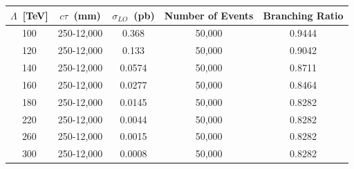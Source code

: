\begin{minipage}{0.90\linewidth} 
\begin{center}
\centering
\begin{tabular}{c c c c c}
       \toprule
        \hline
        $\Lambda$~[TeV] & $c\tau$~(mm) & $\sigma_{LO}$~(pb) & \bfseries{Number of Events} & \bfseries{Branching Ratio}\\
       \hline
       \toprule
       100 & 250-12,000  & 0.368  & 50,000 & 0.9444\\
       120 & 250-12,000  & 0.133  & 50,000 & 0.9042\\
       140 & 250-12,000  & 0.0574 & 50,000 & 0.8711\\
       160 & 250-12,000  & 0.0277 & 50,000 & 0.8464\\
       180 & 250-12,000  & 0.0145 & 50,000 & 0.8282\\
       220 & 250-12,000  & 0.0044 & 50,000 & 0.8282\\
       260 & 250-12,000  & 0.0015 & 50,000 & 0.8282\\
       300 & 250-12,000  & 0.0008 & 50,000 & 0.8282\\
       \hline
       \bottomrule
       \end{tabular}  
\label{tab:mc_GMSB_sample}
\end{center}
\end{minipage}

